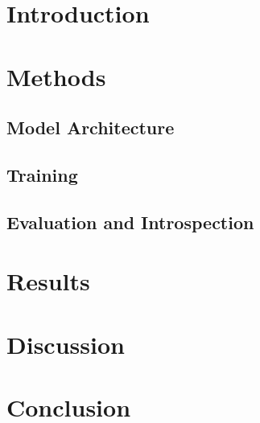 \documentclass[conference]{IEEEtran}
\begin{document}
\section{Introduction}
\section{Methods}
\subsection{Model Architecture}
\subsection{Training}
\subsection{Evaluation and Introspection}

\section{Results}

\section{Discussion}

\section{Conclusion}

\break{}

\end{document}
